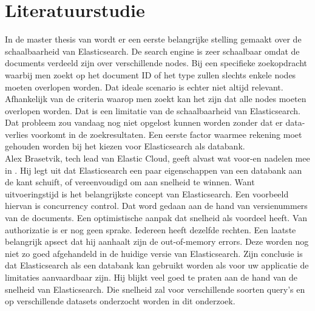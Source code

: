 \documentclass[fleqn,10pt]{voorstel}
\begin{document}
	
	
	\section{Literatuurstudie}
	\label{sec:literatuurstudie}
	
	In de master thesis van \textcite{Berglund2013} wordt er een eerste belangrijke stelling gemaakt over de schaalbaarheid van Elasticsearch. De search engine is zeer schaalbaar omdat de documents verdeeld zijn over verschillende nodes. Bij een specifieke zoekopdracht waarbij men zoekt op het document ID of het type zullen slechts enkele nodes moeten overlopen worden. Dat ideale scenario is echter niet altijd relevant. Afhankelijk van de criteria waarop men zoekt kan het zijn dat alle nodes moeten overlopen worden. Dat is een limitatie van de schaalbaarheid van Elasticsearch. Dat probleem zou vandaag nog niet opgelost kunnen worden zonder dat er data-verlies voorkomt in de zoekresultaten. Een eerste factor waarmee rekening moet gehouden worden bij het kiezen voor Elasticsearch als databank.
	\\
	Alex Brasetvik, tech lead van Elastic Cloud, geeft alvast wat voor-en nadelen mee in \textcite{Brasetvik2013}. Hij legt uit dat Elasticsearch een paar eigenschappen van een databank aan de kant schuift, of vereenvoudigd om aan snelheid te winnen. Want uitvoeringstijd is het belangrijkste concept van Elasticsearch. Een voorbeeld hiervan is concurrency control. Dat word gedaan aan de hand van versienummers van de documents. Een optimistische aanpak dat snelheid als voordeel heeft. Van authorizatie is er nog geen sprake. Iedereen heeft dezelfde rechten. Een laatste belangrijk apsect dat hij aanhaalt zijn de out-of-memory errors. Deze worden nog niet zo goed afgehandeld in de huidige versie van Elasticsearch.
	Zijn conclusie is dat Elasticsearch als een databank kan gebruikt worden als voor uw applicatie de limitaties aanvaardbaar zijn. Hij blijkt veel goed te praten aan de hand van de snelheid van Elasticsearch. Die snelheid zal voor verschillende soorten query’s en op verschillende datasets onderzocht worden in dit onderzoek.
	
	
	
\end{document}
